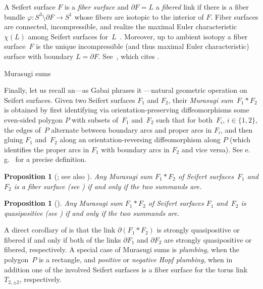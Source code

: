 \documentclass{amsart}
\makeatletter
\renewcommand\subsection{\@startsection{subsection}{2}%
  \z@{-.5\linespacing\@plus-.7\linespacing}{.5\linespacing}%
  {\normalfont\scshape}}
\theoremstyle{definition}
\theoremstyle{remark}
\theoremstyle{plain}
\newtheorem{proposition}[definition]{Proposition}
\newcommand{\eg}{e.\,g.~}
\makeatother
\begin{document}
A Seifert surface $F$ is a \emph{fiber surface} and $\partial F = L$ a \emph{fibered} link if there is a fiber bundle $\varphi \colon S^3 \setminus \partial F \to S^1$ whose fibers are isotopic to the interior of $F$. Fiber surfaces are connected, incompressible, and realize the maximal Euler characteristic~$\chi(L)$ among Seifert surfaces for~$L$~\cite{stallings_1978}. Moreover, up to ambient isotopy a fiber surface~$F$ is the unique incompressible (and thus maximal Euler characteristic) surface with boundary $L = \partial F$. See~\cite[Proposition 2.19]{rudolph_handbook}, which cites \cite{stallings_1978,gabai_sum_I,gabai:foliations,gabai:arborescent}.

\subsection{Murasugi sums}\label{Murasugi_sums}

Finally, let us recall an---as Gabai phrases it \cite{gabai_sum_I,gabai_sum_II}---natural geometric operation on Seifert surfaces. Given two Seifert surfaces $F_1$ and $F_2$, their \emph{Murasugi sum}~$F_1 \ast F_2$ is obtained by first identifying via orientation-preserving diffeomorphisms some even-sided polygon $P$ with subsets of~$F_1$ and~$F_2$ such that for both~$F_i$, $i \in \{1,2\}$, the edges of~$P$ alternate between boundary arcs and proper arcs in $F_i$, and then gluing $F_1$ and~$F_2$ along an orientation-reversing diffeomorphism along $P$ (which identifies the proper arcs in $F_1$ with boundary arcs in $F_2$ and vice versa). See \eg \cite[Chapter~4.2]{kawauchi_book} for a precise definition.

\begin{proposition}[{\cite{stallings_1978,gabai_sum_I,gabai_sum_II}; see also 
\cite[Theorem 3.1]{gabai_det_fibred}}]\label{prop:Murasugi_sum_fib}
    Any Murasugi sum $F_1 \ast F_2$ of Seifert surfaces~$F_1$ and $F_2$ is a fiber surface (see ) if and only if the two summands are. 
\end{proposition}

\begin{proposition}[{\cite{Rudolph_V}}]\label{prop:Murasugi_sum_qp}
    Any Murasugi sum $F_1 \ast F_2$ of Seifert surfaces $F_1$ and~$F_2$ is quasipositive (see ) if and only if the two summands are.
\end{proposition}

A direct corollary of  is that the link $\partial(F_1 \ast F_2)$ is strongly quasipositive or fibered if and only if both of the links $\partial F_1$ and $\partial F_2$ are strongly quasipositive or fibered, respectively. A special case of Murasugi sums is \emph{plumbing}, when the polygon~$P$ is a rectangle, and \emph{positive} or \emph{negative} \emph{Hopf plumbing}, when in addition one of the involved Seifert surfaces is a fiber surface for the torus link~$T_{2,\pm 2}$, respectively. %
\end{document}
